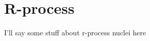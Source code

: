\chapter{R-process}\label{chap:rprocess}

\maketitle
I'll say some stuff about r-process nuclei here